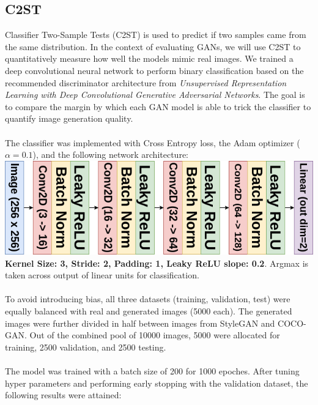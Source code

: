 \documentclass[12pt]{article}
\begin{document}
\begin{multicols*}{2}
        \subsection{C2ST}
        \label{subsec:c2st}
        Classifier Two-Sample Tests (C2ST) is used to predict if two samples came from the same distribution\cite{c2st}.
        In the context of evaluating GANs, we will use C2ST to quantitatively measure how well the models mimic real images.
        We trained a deep convolutional neural network to perform binary classification based on the recommended discriminator architecture from \textit{Unsupervised Representation Learning
with Deep Convolutional Generative Adversarial Networks}\cite{dcgan}.
        The goal is to compare the margin by which each GAN model is able to trick the classifier to quantify image generation quality.
        \\\\
        The classifier was implemented with Cross Entropy loss, the Adam optimizer ($\alpha=0.1$), and the following network architecture:\\
        \includegraphics[scale=0.35]{c2st-diagram.png}\\
        \textbf{Kernel Size: 3, Stride: 2, Padding: 1, Leaky ReLU slope: 0.2}.
        Argmax is taken across output of linear units for classification.
        \\\\
        To avoid introducing bias, all three datasets (training, validation, test) were equally balanced with real and generated images (5000 each).
        The generated images were further divided in half between images from StyleGAN and COCO-GAN.
        Out of the combined pool of 10000 images, 5000 were allocated for training, 2500 validation, and 2500 testing.
        \\\\
        The model was trained with a batch size of 200 for 1000 epoches.
        After tuning hyper parameters and performing early stopping with the validation dataset, the following results were attained:
        \\


\end{multicols*}
\end{document}
